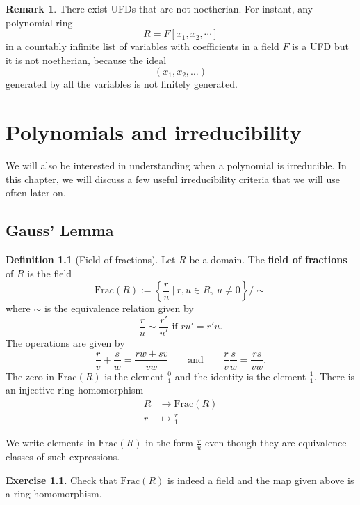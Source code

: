\documentclass[12pt]{report}
\numberwithin{equation}{section}
\numberwithin{theorem}{chapter}
\theoremstyle{definition}
\newtheorem{definition}[theorem]{Definition}
\newtheorem{exercise}{Exercise}
\newtheorem*{basic properties}{Basic Properties}
\newtheorem*{Important Remark}{Important Remark}
\newtheorem{remark}[theorem]{Remark}
\begin{document}
\begin{remark}
There exist UFDs that are not noetherian. For instant, any polynomial ring 
$$R = F[x_1, x_2, \cdots]$$ 
in a countably infinite list of variables with coefficients in a field $F$ is a UFD but it is not noetherian, because the ideal
$$(x_1, x_2, \ldots)$$	
generated by all the variables is not finitely generated.
\end{remark}




\chapter{Polynomials and irreducibility}


We will also be interested in understanding when a polynomial is irreducible. In this chapter, we will discuss a few useful irreducibility criteria that we will use often later on. 


\section{Gauss' Lemma}



\begin{definition}[Field of fractions]
Let $R$ be a domain. The {\bf field of fractions} of $R$ is the field
$$\mathrm{Frac}(R) := \left\{ \frac{r}{u} \ \Big| \ r,u\in R, \ u\neq 0 \right\} / \sim$$
where $\sim$ is the equivalence relation given by
$$\displaystyle \frac{r}{u}\sim \frac{r'}{u'} \textrm{ if } ru'=r'u.$$ 
The operations are given by 
	\[ \frac{r}{v}+\frac{s}{w}=\frac{rw+sv}{vw} \qquad \text{and} \qquad  \frac{r}{v}\frac{s}{w}=\frac{rs}{vw}.\]
	The zero in $\mathrm{Frac}(R)$ is the element $\frac{0}{1}$ and the identity is the element $\frac{1}{1}$.
	There is an injective ring homomorphism 
	\[ \begin{aligned} R &\to \mathrm{Frac}(R) \\
	r &\mapsto \frac{r}{1} \end{aligned}\] 
\end{definition}

We write elements in $\mathrm{Frac}(R)$ in the form $\frac{r}{u}$ even though they are equivalence classes of such expressions.

\begin{exercise}
	Check that $\mathrm{Frac}(R)$ is indeed a field and the map given above is a ring homomorphism. \end{exercise}
\end{document}
